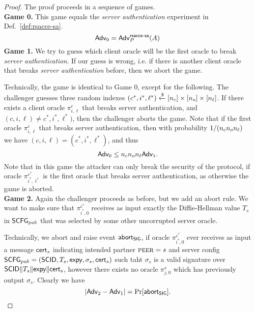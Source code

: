 \begin{proof}
 The proof proceeds in a sequence of games. \vspace{10pt}\\
 {\bfseries Game 0.} This game equals the \textit{server authentication} experiment in Def.~\ref{def:rsacce-sa}.\\
 \begin{equation}
  \mathsf{Adv}_0 = \mathsf{Adv}^{\mathsf{rsacce\textsc{-} sa}}_{P}(A)
 \end{equation}%
%
%
 \textbf{Game 1.} We try to guess which client oracle will be the first oracle to break \textit{server authentication}. If our guess is wrong, i.e. if there is another client oracle that breaks \textit{server authentication} before, then we abort the game.

 Technically, the game is identical to Game 0, except for the following. The challenger guesses three random indexes $(c^{\ast}, i^{\ast}, \ell^{\ast}) \xleftarrow{\$} [n_c] \times [n_o] \times [n_{\ell}]$. If there exists a client oracle $\pi^c_{i,\ell}$ that breaks server authentication, and $(c, i, \ell) \neq c^{\ast}, i^{\ast}, \ell^{\ast})$, then the challenger aborts the game. Note that if the first oracle $\pi^c_{i,\ell}$ that breaks server authentication, then with probability $1/(n_c n_o n_{\ell})$ we have $(c,i,\ell) = (c^{\ast}, i^{\ast}, \ell^{\ast})$, and thus
 \begin{equation}
  \mathsf{Adv}_0 \leq n_c n_o n_{\ell} \mathsf{Adv}_1.
 \end{equation}%
 Note that in this game the attacker can only break the security of the protocol, if oracle $\pi^{c^{\ast}}_{i^{\ast},\ell^{\ast}}$ is the first oracle that breaks server authentication, as otherwise the game is aborted.
\vspace{10pt}\\%
%
%
 \textbf{Game 2.} Again the challenger proceeds as before, but we add an abort rule. We want to make sure that $\pi^{c^\ast}_{i^{\ast},0}$ receives as input exactly the Diffie-Hellman value $T_s$ in $\mathsf{SCFG}_{pub}$ that was selected by some other uncorrupted server oracle.

 Technically, we abort and raise event $\mathsf{abort}_{\mathsf{SIG}}$, if oracle $\pi^{c^{\ast}}_{i^{\ast},0}$ ever receives as input a message $\mathsf{cert}_s$ indicating intended partner $\textsc{peer} = s$ and server config $\mathsf{SCFG}_{pub} = (\mathsf{SCID}, T_s, \mathsf{expy}, \sigma_s, \mathsf{cert}_s)$ such taht $\sigma_s$ is a valid signature over $\mathsf{SCID} \| T_s \| \mathsf{expy} \| \mathsf{cert}_s$, however there exists no oracle $\pi^s_{j,0}$ which has previously output $\sigma_s$. Clearly we have
 \begin{equation}
  |\mathsf{Adv}_2 - \mathsf{Adv}_1| = \Pr[\mathsf{abort}_{\mathsf{SIG}}].
 \end{equation}%


\end{proof}
